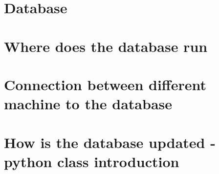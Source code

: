 \documentclass[../main.tex]{subfiles}
\begin{document}
\section{Database}
\section{Where does the database run}
\section{Connection between different machine to the database}
\section{How is the database updated - python class introduction}
\cleardoublepage
\end{document}
